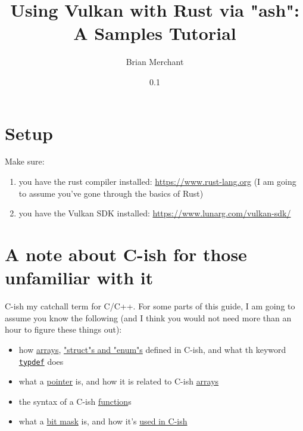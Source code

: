 \documentclass[12pt,letterpaper]{article}
\newcommand{\cil}[1]{\texttt{#1}}
\begin{document}
\title{Using Vulkan with Rust via "ash": A Samples Tutorial}
\date{0.1}
\author{Brian Merchant}
\maketitle
\reversemarginpar


\section{Setup}
	Make sure:
		\begin{enumerate}
			\item you have the rust compiler installed: \href{https://www.rust-lang.org}{https://www.rust-lang.org} (I am going to assume you've gone through the basics of Rust)
			
			\item you have the Vulkan SDK installed: \href{https://www.lunarg.com/vulkan-sdk/}{https://www.lunarg.com/vulkan-sdk/}
		\end{enumerate}
	
\section{A note about C-ish for those unfamiliar with it}
	C-ish my catchall term for C/C++. For some parts of this guide, I am going to assume you know the following (and I think you would not need more than an hour to figure these things out):
		\begin{itemize}
			\item how \href{https://en.wikibooks.org/wiki/C_Programming/Arrays_and_strings}{arrays}, \href{https://en.wikibooks.org/wiki/C_Programming/Advanced_data_types}{"struct"s and "enum"s} defined in C-ish, and what th keyword \href{https://en.wikibooks.org/wiki/C_Programming/Advanced_data_types}{\cil{typdef}} does
			
			\item what a \href{https://en.wikibooks.org/wiki/C_Programming/Pointers_and_arrays}{pointer} is, and how it is related to C-ish \href{https://en.wikibooks.org/wiki/C_Programming/Pointers_and_arrays#Pointers_and_Arrays}{arrays}
			
			\item the syntax of a C-ish \href{https://en.wikibooks.org/wiki/C_Programming/Procedures_and_functions}{function}s
			
			\item what a \href{https://en.wikipedia.org/wiki/Mask_(computing)}{bit mask} is, and how it's \href{https://stackoverflow.com/questions/10493411/what-is-bit-masking}{used in C-ish}
		\end{itemize}
	
\end{document}

